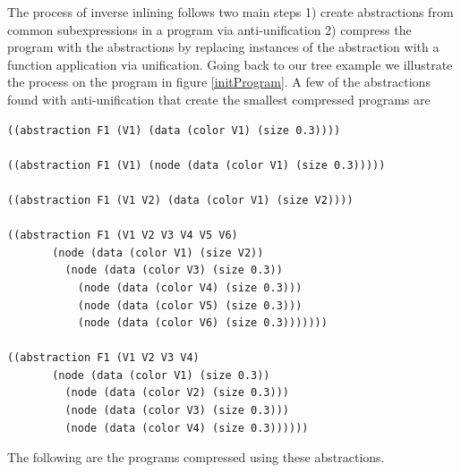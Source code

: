 \documentclass[a4paper,10pt]{article}
\begin{document}
The process of inverse inlining follows two main steps 1) create abstractions from common subexpressions in a program via anti-unification 2) compress the program with the abstractions by replacing instances of the abstraction with a function application via unification.  Going back to our tree example we illustrate the process on the program in figure \ref{initProgram}.
A few of the abstractions found with anti-unification that create the smallest compressed programs are 
\begin{lstlisting}
((abstraction F1 (V1) (data (color V1) (size 0.3))))

((abstraction F1 (V1) (node (data (color V1) (size 0.3)))))

((abstraction F1 (V1 V2) (data (color V1) (size V2))))

((abstraction F1 (V1 V2 V3 V4 V5 V6)
       (node (data (color V1) (size V2))
         (node (data (color V3) (size 0.3))
           (node (data (color V4) (size 0.3)))
           (node (data (color V5) (size 0.3)))
           (node (data (color V6) (size 0.3)))))))

((abstraction F1 (V1 V2 V3 V4)
       (node (data (color V1) (size 0.3))
         (node (data (color V2) (size 0.3)))
         (node (data (color V3) (size 0.3)))
         (node (data (color V4) (size 0.3))))))
\end{lstlisting}
The following are the programs compressed using these abstractions.
\end{document}
